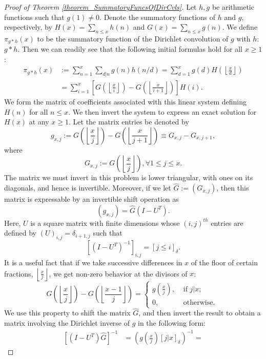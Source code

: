 \documentclass[11pt,reqno,a4letter]{article}
\numberwithin{figure}{section}
\numberwithin{table}{section}
\newcommand{\Iverson}[1]{\ensuremath{\left[#1\right]_{\delta}}}
\newcommand{\floor}[1]{\left\lfloor #1 \right\rfloor}
\newcommand{\Floor}[2]{\ensuremath{\left\lfloor \frac{#1}{#2} \right\rfloor}}
\theoremstyle{plain}
\numberwithin{theorem}{section}
\theoremstyle{definition}
\begin{document}
\begin{proof}[Proof of Theorem \ref{theorem_SummatoryFuncsOfDirCvls}] 
\label{proofOf_theorem_SummatoryFuncsOfDirCvls} 
Let $h,g$ be arithmetic functions such that $g(1) \neq 0$. 
Denote the summatory functions of $h$ and $g$, 
respectively, by $H(x) = \sum_{n \leq x} h(n)$ and $G(x) = \sum_{n \leq x} g(n)$. 
We define $\pi_{g \ast h}(x)$ to be the summatory function of the 
Dirichlet convolution of $g$ with $h$: $g \ast h$. 
Then we can readily see that the following initial formulas hold for all $x \geq 1$: 
\begin{align*} 
\pi_{g \ast h}(x) & := \sum_{n=1}^{x} \sum_{d|n} g(n) h(n/d) = \sum_{d=1}^x g(d) H\left(\floor{\frac{x}{d}}\right) \\ 
     & = \sum_{i=1}^x \left[G\left(\floor{\frac{x}{i}}\right) - G\left(\floor{\frac{x}{i+1}}\right)\right] H(i). 
\end{align*} 
We form the matrix of coefficients associated with this linear system defining $H(n)$ for all $n \leq x$. 
We then invert the system to express an 
exact solution for $H(x)$ at any $x \geq 1$. 
Let the matrix entries be denoted by 
\[
g_{x,j} := G\left(\floor{\frac{x}{j}}\right) - G\left(\floor{\frac{x}{j+1}}\right) \equiv G_{x,j} - G_{x,j+1}, 
\] 
where 
\[
G_{x,j} := G\left(\Floor{x}{j}\right), \forall 1 \leq j \leq x. 
\]
The matrix we must invert in this problem is lower triangular, with ones on its diagonals, and hence is invertible. 
Moreover, if we let $\hat{G} := (G_{x,j})$, then this matrix is 
expressable by an invertible shift operation as 
\[
(g_{x,j}) = \hat{G} (I - U^{T}). 
\]
Here, $U$ is a square matrix with finite dimensions 
whose $(i,j)^{th}$ entries are defined by $(U)_{i,j} = \delta_{i+1,j}$ such that 
\[
\left[(I - U^T)^{-1}\right]_{i,j} = \Iverson{j \leq i}. 
\]
It is a useful fact that if we take successive differences in $x$ of the 
floor of certain fractions, $\Floor{x}{j}$, we get non-zero behavior at the 
divisors of $x$: 
\[
G\left(\floor{\frac{x}{j}}\right) - G\left(\floor{\frac{x-1}{j}}\right) = 
     \begin{cases} 
     g\left(\frac{x}{j}\right), & \text{ if $j | x$; } \\ 
     0, & \text{ otherwise. } 
     \end{cases}
\]
We use this property to shift the matrix $\hat{G}$, and then invert the result to obtain a matrix involving the 
Dirichlet inverse of $g$ in the following form: 
\begin{align*} 
\left[(I-U^{T}) \hat{G}\right]^{-1} & = \left(g\left(\frac{x}{j}\right) \Iverson{j|x}\right)^{-1} = 

\end{align*}
\end{proof}
\end{document}
